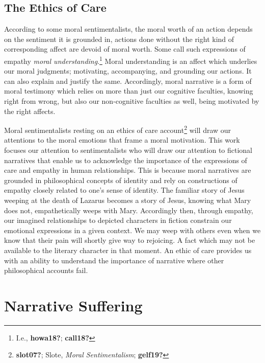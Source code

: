 \documentclass[
  12pt,
]{book}
\theoremstyle{definition}
\theoremstyle{definition}
\theoremstyle{definition}
\theoremstyle{definition}
\theoremstyle{remark}
\begin{document}
\subsection*{The Ethics of Care}\label{the-ethics-of-care}

According to some moral sentimentalists, the moral worth of an action depends on the sentiment it is grounded in, actions done without the right kind of corresponding affect are devoid of moral worth. Some call such expressions of empathy \emph{moral understanding}.\footnote{I.e., \textbf{howa18?}; \textbf{call18?}} Moral understanding is an affect which underlies our moral judgments; motivating, accompanying, and grounding our actions. It can also explain and justify the same. Accordingly, moral narrative is a form of moral testimony which relies on more than just our cognitive faculties, knowing right from wrong, but also our non-cognitive faculties as well, being motivated by the right affects.

Moral sentimentalists resting on an ethics of care account\footnote{\textbf{slot07?}; Slote, \emph{Moral {Sentimentalism}}; \textbf{gelf19?}} will draw our attentions to the moral emotions that frame a moral motivation. This work focuses our attention to sentimentalists who will draw our attention to fictional narratives that enable us to acknowledge the importance of the expressions of care and empathy in human relationships. This is because moral narratives are grounded in philosophical concepts of identity and rely on constructions of empathy closely related to one's sense of identity. The familiar story of Jesus weeping at the death of Lazarus becomes a story of Jesus, knowing what Mary does not, empathetically weeps with Mary. Accordingly then, through empathy, our imagined relationships to depicted characters in fiction constrain our emotional expressions in a given context. We may weep with others even when we know that their pain will shortly give way to rejoicing. A fact which may not be available to the literary character in that moment. An ethic of care provides us with an ability to understand the importance of narrative where other philosophical accounts fail.

\section{Narrative Suffering}\label{narrative-suffering}
\end{document}

